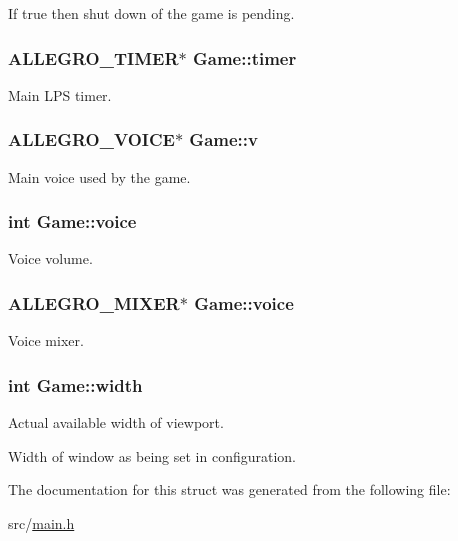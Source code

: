 If true then shut down of the game is pending. \hypertarget{structGame_a8d6d4f06c6412d085112cd007977d868}{
\subsubsection[{timer}]{\setlength{\rightskip}{0pt plus 5cm}A\+L\+L\+E\+G\+R\+O\+\_\+\+T\+I\+M\+E\+R$\ast$ Game\+::timer}}\label{structGame_a8d6d4f06c6412d085112cd007977d868}
Main L\+P\+S timer. \hypertarget{structGame_ab27cb95bcd1591fec45317a1e9f5062d}{
\subsubsection[{v}]{\setlength{\rightskip}{0pt plus 5cm}A\+L\+L\+E\+G\+R\+O\+\_\+\+V\+O\+I\+C\+E$\ast$ Game\+::v}}\label{structGame_ab27cb95bcd1591fec45317a1e9f5062d}
Main voice used by the game. \hypertarget{structGame_a5523ac4fdb8fdbd2e86b58a3fbc2e6d0}{
\subsubsection[{voice}]{\setlength{\rightskip}{0pt plus 5cm}int Game\+::voice}}\label{structGame_a5523ac4fdb8fdbd2e86b58a3fbc2e6d0}
Voice volume. \hypertarget{structGame_acc651129cb9fafedf0588e229827c543}{
\subsubsection[{voice}]{\setlength{\rightskip}{0pt plus 5cm}A\+L\+L\+E\+G\+R\+O\+\_\+\+M\+I\+X\+E\+R$\ast$ Game\+::voice}}\label{structGame_acc651129cb9fafedf0588e229827c543}
Voice mixer. \hypertarget{structGame_a06b5a675d7c0f6a9b58d395872b1a4e7}{
\subsubsection[{width}]{\setlength{\rightskip}{0pt plus 5cm}int Game\+::width}}\label{structGame_a06b5a675d7c0f6a9b58d395872b1a4e7}
Actual available width of viewport.

Width of window as being set in configuration. 

The documentation for this struct was generated from the following file\+:\begin{DoxyCompactItemize}
\item 
src/\hyperlink{main_8h}{main.\+h}\end{DoxyCompactItemize}
